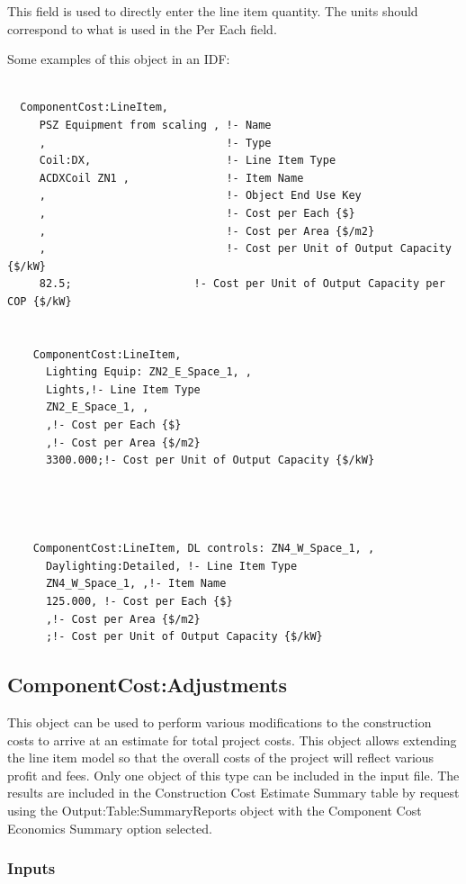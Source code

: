 This field is used to directly enter the line item quantity. The units should correspond to what is used in the Per Each field.

Some examples of this object in an IDF:

\begin{lstlisting}

  ComponentCost:LineItem,
     PSZ Equipment from scaling , !- Name
     ,                            !- Type
     Coil:DX,                     !- Line Item Type
     ACDXCoil ZN1 ,               !- Item Name
     ,                            !- Object End Use Key
     ,                            !- Cost per Each {$}
     ,                            !- Cost per Area {$/m2}
     ,                            !- Cost per Unit of Output Capacity {$/kW}
     82.5;                   !- Cost per Unit of Output Capacity per COP {$/kW}


    ComponentCost:LineItem,
      Lighting Equip: ZN2_E_Space_1, ,
      Lights,!- Line Item Type
      ZN2_E_Space_1, ,
      ,!- Cost per Each {$}
      ,!- Cost per Area {$/m2}
      3300.000;!- Cost per Unit of Output Capacity {$/kW}




    ComponentCost:LineItem, DL controls: ZN4_W_Space_1, ,
      Daylighting:Detailed, !- Line Item Type
      ZN4_W_Space_1, ,!- Item Name
      125.000, !- Cost per Each {$}
      ,!- Cost per Area {$/m2}
      ;!- Cost per Unit of Output Capacity {$/kW}
\end{lstlisting}

\subsection{ComponentCost:Adjustments}\label{componentcostadjustments}

This object can be used to perform various modifications to the construction costs to arrive at an estimate for total project costs. This object allows extending the line item model so that the overall costs of the project will reflect various profit and fees. Only one object of this type can be included in the input file. The results are included in the Construction Cost Estimate Summary table by request using the Output:Table:SummaryReports object with the Component Cost Economics Summary option selected.

\subsubsection{Inputs}\label{inputs-1}

